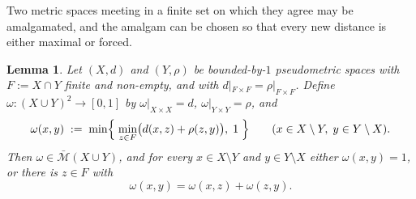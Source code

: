 \documentclass[11pt]{article}
\newtheorem{lemma}[theorem]{Lemma}
\theoremstyle{definition}
\theoremstyle{remark}
\newcommand{\bM}{\bar{\mathcal{M}}}
\begin{document}
Two metric spaces meeting in a finite set on which they agree may be amalgamated, and the
amalgam can be chosen so that every new distance is either maximal or forced.

\begin{lemma}\label{lem:glue}
Let $(X,d)$ and $(Y,\rho)$ be bounded-by-$1$ pseudometric spaces with $F:=X\cap Y$ finite
and non-empty, and with $d|_{F\times F}=\rho|_{F\times F}$. Define
$\omega\colon (X\cup Y)^2\to[0,1]$ by $\omega|_{X\times X}=d$,
$\omega|_{Y\times Y}=\rho$, and
\begin{equation}\label{eq:glue}
\omega(x,y)\;:=\;\min\Bigl\{\;\min_{z\in F}\bigl(d(x,z)+\rho(z,y)\bigr),\;1\;\Bigr\}
\qquad (x\in X\setminus Y,\; y\in Y\setminus X).
\end{equation}
Then $\omega\in\bM(X\cup Y)$, and for every $x\in X\setminus Y$ and $y\in Y\setminus X$
either $\omega(x,y)=1$, or there is $z\in F$ with
\[
\omega(x,y)=\omega(x,z)+\omega(z,y).
\]
\end{lemma}
\end{document}
